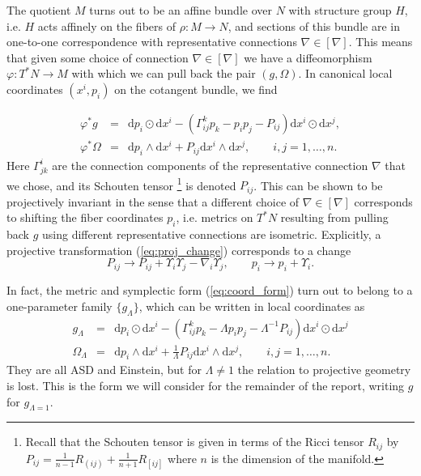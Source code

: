 The quotient $M$ turns out to be an affine bundle over $N$ with
structure group $H$, i.e. $H$ acts affinely on the fibers of $\rho:M\rightarrow N$,
and sections of this bundle are in one-to-one correspondence with
representative connections $\nabla\in[\nabla]$. This means that given
some choice of connection $\nabla\in[\nabla]$ we have a diffeomorphism
$\varphi:T^{*}N\rightarrow M$ with which we can pull back the pair
$(g,\Omega)$. In canonical local coordinates $(x^{i},p_{i})$ on
the cotangent bundle, we find

\begin{eqnarray}
\varphi^{*}g & = & \mathrm{d}p_{i}\odot\mathrm{d}x^{i}-(\Gamma_{ij}^{k}p_{k}-p_{i}p_{j}-P_{ij})\mathrm{d}x^{i}\odot\mathrm{d}x^{j},\label{eq:coord_form}\\
\varphi^{*}\Omega & = & \mathrm{d}p_{i}\wedge\mathrm{d}x^{i}+P_{ij}\mathrm{d}x^{i}\wedge\mathrm{d}x^{j},\qquad i,j=1,\dots ,n.\nonumber 
\end{eqnarray}
Here $\Gamma_{jk}^{i}$ are the connection components of the representative
connection $\nabla$ that we chose, and its Schouten tensor%
\footnote{Recall that the Schouten tensor is given in terms of the Ricci tensor
$R_{ij}$ by $P_{ij}=\frac{1}{n-1}R_{(ij)}+\frac{1}{n+1}R_{[ij]}$
where $n$ is the dimension of the manifold.%
} is denoted $P_{ij}$. This can be shown to be projectively invariant
in the sense that a different choice of $\nabla\in[\nabla]$ corresponds
to shifting the fiber coordinates $p_{i}$, i.e. metrics on $T^{*}N$
resulting from pulling back $g$ using different representative connections
are isometric. Explicitly, a projective transformation (\ref{eq:proj_change})
corresponds to a change
\begin{equation}
P_{ij}\longrightarrow P_{ij}+\Upsilon_{i}\Upsilon_{j}-\nabla_{i}\Upsilon_{j},\qquad p_{i}\longrightarrow p_{i}+\Upsilon_{i}.\label{eq:p_change}
\end{equation}


In fact, the metric and symplectic form (\ref{eq:coord_form}) turn
out to belong to a one-parameter family $\{g_{\Lambda}\}$, which
can be written in local coordinates as 
\begin{eqnarray}
g_{\Lambda} & = & \mathrm{d}p_{i}\odot\mathrm{d}x^{i}-(\Gamma_{ij}^{k}p_{k}-\Lambda p_{i}p_{j}-\Lambda^{-1}P_{ij})\mathrm{d}x^{i}\odot\mathrm{d}x^{j}\label{eq:general_g}\\
\Omega_{\Lambda} & = & \mathrm{d}p_{i}\wedge\mathrm{d}x^{i}+\frac{1}{\Lambda}P_{ij}\mathrm{d}x^{i}\wedge\mathrm{d}x^{j},\qquad i,j=1,\dots ,n.\label{eq:general_omega}
\end{eqnarray}
They are all ASD and Einstein, but for $\Lambda\neq1$ the relation to projective geometry is lost. This is the form we will consider for the remainder of the report,
writing $g$ for $g_{\Lambda=1}$.


